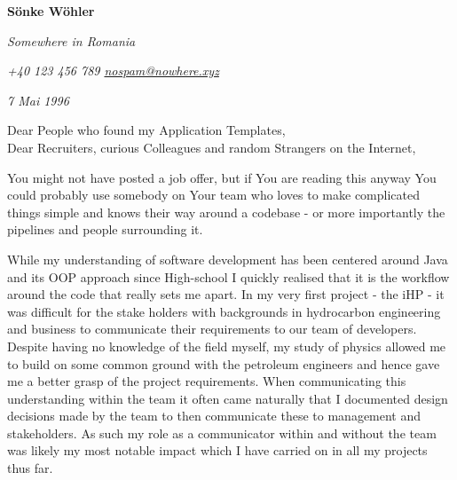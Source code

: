 \documentclass[paper=a4,fontsize=11pt]{scrartcl} %
\newcommand{\sepspace}{\vspace*{1em}}    %
\newcommand{\MyName}[1]{ %
  \Huge \hfill \textbf{#1}\par 
  \hrulefill
  \normalsize \normalfont}
\newcommand{\MyAddress}[3]{ %
  \par \usefont{OT1}{phv}{m}{n}\hfill \textit{#1}
  \par \usefont{OT1}{phv}{m}{n}\hfill \textit{#2}
  \par \usefont{OT1}{phv}{m}{n}\hfill \textit{#3}
  \par \normalfont}
\begin{document}



  \newcommand{\StylisedName}{
    \MyName{ \textcolor{headerColor}{S\"onke W\"ohler} }
  }
  \newcommand{\MyDate}{
    \footnotesize Cri`sana 10.01.2022 \normalsize \\
  }
  \newcommand{\SameAddress}{
    \MyAddress
      { \textcolor{titleColor}{ Somewhere in Romania }}
      { \textcolor{titleColor}{ +40 123 456 789 \hspace{5pt} \href{mailto:nobody@gmail.com}{nospam@nowhere.xyz} }}
      { \textcolor{titleColor}{ 7 Mai 1996 }}
  }

  \newcommand{\CoverAddress}{
    \footnotesize \SameAddress
    \normalsize
  }


  \StylisedName
  \CoverAddress

  \sepspace %
  
  \noindent
  Dear People who found my Application Templates,  \\
  Dear Recruiters, curious Colleagues and random Strangers on the Internet,
  
  \sepspace 

  \noindent  You might not have posted a job offer, but if You are reading this
  anyway You could probably use somebody on Your team who loves to make
  complicated things simple and knows their way around a codebase - or more
  importantly the pipelines and people surrounding it.

  \sepspace
  
  \noindent  While my understanding of software development has been centered
  around Java and its OOP approach since High-school I quickly realised that it
  is the workflow around the code that really sets me apart. In my very first
  project - the iHP - it was difficult for the stake holders with backgrounds
  in hydrocarbon engineering and business to communicate their requirements to
  our team of developers.  Despite having no knowledge of the field myself, my
  study of physics allowed me to build on some common ground with the petroleum
  engineers and hence gave me a better grasp of the project requirements. When
  communicating this understanding within the team it often came naturally that
  I documented design decisions made by the team to then communicate these to
  management and stakeholders.  As such my role as a communicator within and
  without the team was likely my most notable impact which I have carried on in
  all my projects thus far.
\end{document}
